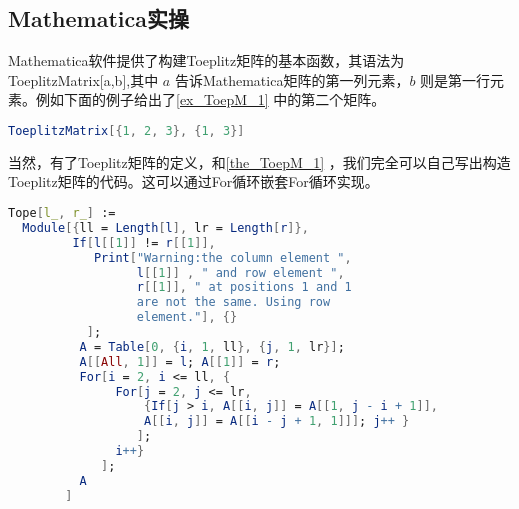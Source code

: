 \subsection{Mathematica实操}
Mathematica软件提供了构建Toeplitz矩阵的基本函数，其语法为 ToeplitzMatrix[a,b],其中 $a$ 告诉Mathematica矩阵的第一列元素，$b$ 则是第一行元素。例如下面的例子给出了\autoref{ex_ToepM_1} 中的第二个矩阵。
\begin{lstlisting}[language=mathematica, caption=Mathematica构造Toeplitz矩阵]
ToeplitzMatrix[{1, 2, 3}, {1, 3}]
\end{lstlisting}
当然，有了Toeplitz矩阵的定义，和\autoref{the_ToepM_1} ，我们完全可以自己写出构造Toeplitz矩阵的代码。这可以通过For循环嵌套For循环实现。
\begin{lstlisting}[language=mathematica, caption=Mathematica自写Toeplitz矩阵代码]
Tope[l_, r_] := 
  Module[{ll = Length[l], lr = Length[r]},
         If[l[[1]] != r[[1]], 
            Print["Warning:the column element ",
                  l[[1]] , " and row element ", 
                  r[[1]], " at positions 1 and 1
                  are not the same. Using row 
                  element."], {}
           ];
          A = Table[0, {i, 1, ll}, {j, 1, lr}];
          A[[All, 1]] = l; A[[1]] = r;
          For[i = 2, i <= ll, {
               For[j = 2, j <= lr,
                   {If[j > i, A[[i, j]] = A[[1, j - i + 1]], 
                   A[[i, j]] = A[[i - j + 1, 1]]]; j++ }
                  ];
               i++}
             ];
          A
        ]
\end{lstlisting}

